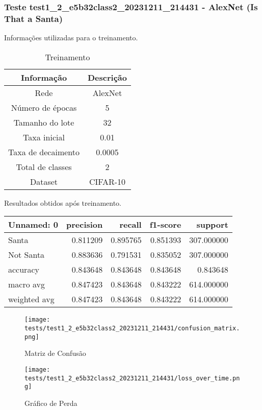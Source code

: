 \subsubsection{Teste test1_2_e5b32class2_20231211_214431 - AlexNet (Is That a Santa)}

Informações utilizadas para o treinamento.

\begin{table}[ht]
   \centering
   \caption{Treinamento}
   \label{tab:modelos}
   \begin{tabular}{| c | c | }
      \hline 
      \textbf{Informação} & \textbf{Descrição} \\
      \hline \hline 
      Rede & AlexNet \\
      \hline
      Número de épocas & 5\\
      \hline
      Tamanho do lote & 32\\
      \hline
      Taxa inicial & 0.01 \\
      \hline
      Taxa de decaimento & 0.0005 \\
      \hline
      Total de classes & 2\\
      \hline
      Dataset & CIFAR-10\\
      \hline
   \end{tabular} 
\end{table}

Resultados obtidos após treinamento.

\begin{tabular}{lrrrr}
\toprule
  Unnamed: 0 &  precision &   recall &  f1-score &    support \\
\midrule
       Santa &   0.811209 & 0.895765 &  0.851393 & 307.000000 \\
   Not Santa &   0.883636 & 0.791531 &  0.835052 & 307.000000 \\
    accuracy &   0.843648 & 0.843648 &  0.843648 &   0.843648 \\
   macro avg &   0.847423 & 0.843648 &  0.843222 & 614.000000 \\
weighted avg &   0.847423 & 0.843648 &  0.843222 & 614.000000 \\
\bottomrule
\end{tabular}


\begin{figure}[ht]
 \begin{center}
   \texttt{[image: tests/test1\_2\_e5b32class2\_20231211\_214431/confusion\_matrix.png]}
  \caption{Matriz de Confusão}
  \label{fig:fig03}
 \end{center}
\end{figure}

\begin{figure}[ht]
 \begin{center}
   \texttt{[image: tests/test1\_2\_e5b32class2\_20231211\_214431/loss\_over\_time.png]}
  \caption{Gráfico de Perda}
  \label{fig:fig04}
 \end{center}
\end{figure}
